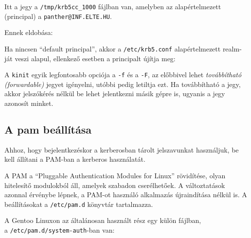 Itt a jegy a \texttt{/tmp/krb5cc\_1000} fájlban van, amelyben az alapértelmezett (principal) a
\texttt{panther@INF.ELTE.HU}.

Ennek eldobása:


Ha nincsen ``default principal'', akkor a \texttt{/etc/krb5.conf} alapértelmezett realm-ját veszi alapul, ellenkező
esetben a principalt újítja meg:


A \texttt{kinit} egyik legfontosabb opciója a \texttt{-f} és a \texttt{-F}, az előbbivel lehet \emph{továbbítható
  (forwardable)} jegyet igényelni, utóbbi pedig letiltja ezt. Ha továbbítható a jegy, akkor jelszókérés nélkül be lehet
jelentkezni másik gépre is, ugyanis a jegy azonosít minket.


\subsection{A pam beállítása}
Ahhoz, hogy bejelentkezéskor a kerberosban tárolt jelszavunkat használjuk, be kell állítani a PAM-ban a kerberos
használatát.

A PAM a ``Pluggable Authentication Modules for Linux'' rövidítése, olyan hitelesítő modulokból áll, amelyek szabadon
cserélhetőek. A változtatások azonnal érvénybe lépnek, a PAM-ot használó alkalmazás újraindítása nélkül is. A
beállításokat a \texttt{/etc/pam.d} könyvtár tartalmazza.

A Gentoo Linuxon az általánosan használt rész egy külön fájlban,\\ a \texttt{/etc/pam.d/system-auth}-ban van:

